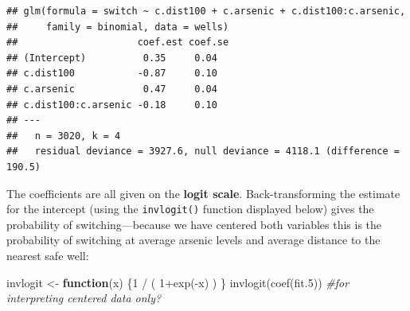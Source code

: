 \documentclass[
]{article}
\newenvironment{Shaded}{\begin{snugshade}}{\end{snugshade}}
\newcommand{\AttributeTok}[1]{\textcolor[rgb]{0.77,0.63,0.00}{#1}}
\newcommand{\CommentTok}[1]{\textcolor[rgb]{0.56,0.35,0.01}{\textit{#1}}}
\newcommand{\ControlFlowTok}[1]{\textcolor[rgb]{0.13,0.29,0.53}{\textbf{#1}}}
\newcommand{\DecValTok}[1]{\textcolor[rgb]{0.00,0.00,0.81}{#1}}
\newcommand{\FloatTok}[1]{\textcolor[rgb]{0.00,0.00,0.81}{#1}}
\newcommand{\FunctionTok}[1]{\textcolor[rgb]{0.00,0.00,0.00}{#1}}
\newcommand{\NormalTok}[1]{#1}
\newcommand{\OtherTok}[1]{\textcolor[rgb]{0.56,0.35,0.01}{#1}}
\newcommand{\SpecialCharTok}[1]{\textcolor[rgb]{0.00,0.00,0.00}{#1}}
\begin{document}
\begin{Shaded}
\end{Shaded}

\begin{verbatim}
## glm(formula = switch ~ c.dist100 + c.arsenic + c.dist100:c.arsenic, 
##     family = binomial, data = wells)
##                     coef.est coef.se
## (Intercept)          0.35     0.04  
## c.dist100           -0.87     0.10  
## c.arsenic            0.47     0.04  
## c.dist100:c.arsenic -0.18     0.10  
## ---
##   n = 3020, k = 4
##   residual deviance = 3927.6, null deviance = 4118.1 (difference = 190.5)
\end{verbatim}

The coefficients are all given on the \textbf{logit scale}.
{Back-transforming the estimate for the intercept (using the
\texttt{invlogit()} function displayed below) gives the probability of
switching}---because we have centered both variables this is the
probability of switching at average arsenic levels and average distance
to the nearest safe well:

\begin{Shaded}
\begin{Highlighting}[]
\NormalTok{invlogit }\OtherTok{\textless{}{-}} \ControlFlowTok{function}\NormalTok{(x) \{}\DecValTok{1} \SpecialCharTok{/}\NormalTok{ ( }\DecValTok{1}\SpecialCharTok{+}\FunctionTok{exp}\NormalTok{(}\SpecialCharTok{{-}}\NormalTok{x) ) \} }
\FunctionTok{invlogit}\NormalTok{(}\FunctionTok{coef}\NormalTok{(fit}\FloatTok{.5}\NormalTok{)) }\CommentTok{\#for interpreting centered data only?}
\end{Highlighting}
\end{Shaded}
\end{document}

